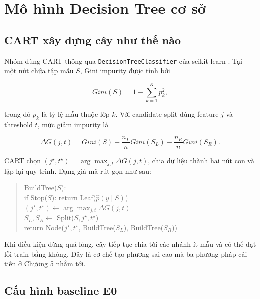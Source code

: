 \chapter{Mô hình Decision Tree cơ sở}

\section{CART xây dựng cây như thế nào}

Nhóm dùng CART thông qua \texttt{DecisionTreeClassifier} của scikit-learn \cite{breiman1984cart,pedregosa2011sklearn}. Tại một nút chứa tập mẫu $S$, Gini impurity được tính bởi

\begin{equation}
    Gini(S)=1-\sum_{k=1}^{K}p_k^2,
    \label{eq:gini}
\end{equation}

trong đó $p_k$ là tỷ lệ mẫu thuộc lớp $k$. Với candidate split dùng feature $j$ và threshold $t$, mức giảm impurity là

\begin{equation}
    \Delta G(j,t)=Gini(S)-\frac{n_L}{n}Gini(S_L)-\frac{n_R}{n}Gini(S_R).
    \label{eq:gini-gain}
\end{equation}

CART chọn $(j^\star,t^\star)=\arg\max_{j,t}\Delta G(j,t)$, chia dữ liệu thành hai nút con và lặp lại quy trình. Dạng giả mã rút gọn như sau:

\begin{quote}
\ttfamily\small
BuildTree($S$):\\
\hspace*{1em}if Stop($S$): return Leaf($\hat p(y\mid S)$)\\
\hspace*{1em}$(j^\star,t^\star)\leftarrow\arg\max_{j,t}\Delta G(j,t)$\\
\hspace*{1em}$S_L,S_R\leftarrow$ Split($S,j^\star,t^\star$)\\
\hspace*{1em}return Node($j^\star,t^\star$, BuildTree($S_L$), BuildTree($S_R$))
\end{quote}

Khi điều kiện dừng quá lỏng, cây tiếp tục chia tới các nhánh ít mẫu và có thể đạt lỗi train bằng không. Đây là cơ chế tạo phương sai cao mà ba phương pháp cải tiến ở Chương 5 nhắm tới.

\section{Cấu hình baseline E0}

